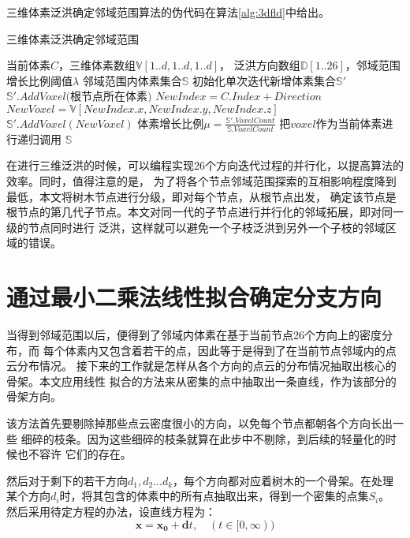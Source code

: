 三维体素泛洪确定邻域范围算法的伪代码在算法\ref{alg:3dfld}中给出。
\begin{algorithm}[H] 
	\caption{三维体素泛洪确定邻域范围}
	\label{alg:3dfld}
	\begin{algorithmic}[1]
		\Require 当前体素$C$，三维体素数组$\mathbb{V}[1..d,1..d,1..d]$，
		泛洪方向数组$\mathbb{D}[1..26]$，邻域范围增长比例阈值$\lambda$
		\Ensure	邻域范围内体素集合$\mathbb{S}$
		\State 初始化单次迭代新增体素集合$\mathbb{S'}$
		\State $\mathbb{S'}.AddVoxel($根节点所在体素$)$
			\State $NewIndex = C.Index + Direction$
			\State $NewVoxel = \mathbb{V}[NewIndex.x,NewIndex.y,NewIndex.z]$
				\State $\mathbb{S'}.AddVoxel(NewVoxel)$
			\EndIf
		\EndFor
		\State 体素增长比例$\mu=\frac{\mathbb{S'}.VoxelCount}{\mathbb{S}.VoxelCount}$
		\If{$\mu > \lambda$}
				\State 把$voxel$作为当前体素进行递归调用
			\EndFor
		\EndIf
		\State \Return $\mathbb{S}$
	\end{algorithmic}
\end{algorithm}

在进行三维泛洪的时候，可以编程实现26个方向迭代过程的并行化，以提高算法的效率。同时，值得注意的是，
为了将各个节点邻域范围探索的互相影响程度降到最低，本文将树木节点进行分级，即对每个节点，从根节点出发，
确定该节点是根节点的第几代子节点。本文对同一代的子节点进行并行化的邻域拓展，即对同一级的节点同时进行
泛洪，这样就可以避免一个子枝泛洪到另外一个子枝的邻域区域的错误。

\section{通过最小二乘法线性拟合确定分支方向}
\label{subsec:leastsquares}
当得到邻域范围以后，便得到了邻域内体素在基于当前节点26个方向上的密度分布，而
每个体素内又包含着若干的点，因此等于是得到了在当前节点邻域内的点云分布情况。
接下来的工作就是怎样从各个方向的点云的分布情况抽取出核心的骨架。本文应用线性
拟合的方法来从密集的点中抽取出一条直线，作为该部分的骨架方向。

该方法首先要剔除掉那些点云密度很小的方向，以免每个节点都朝各个方向长出一些
细碎的枝条。因为这些细碎的枝条就算在此步中不剔除，到后续的轻量化的时候也不容许
它们的存在。

然后对于剩下的若干方向$d_1,d_2...d_k$，每个方向都对应着树木的一个骨架。在处理
某个方向$d_i$时，将其包含的体素中的所有点抽取出来，得到一个密集的点集$S_i$。
然后采用待定方程的办法，设直线方程为：
\begin{equation}
	\mathbf{x} = \mathbf{x_0} + \mathbf{d}t,\quad(t \in [0,\infty))
\end{equation}

